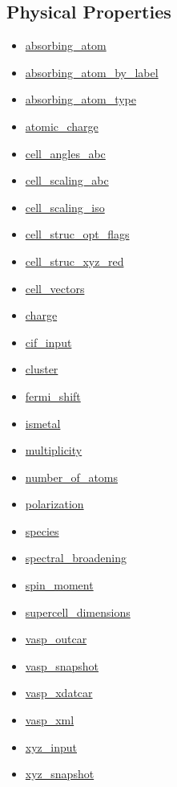 \documentclass[11pt]{article}
\begin{document}
\subsection*{Physical Properties}
\begin{itemize}
\item \hyperref[kw:absorbing-atom]{absorbing\_atom}
\item \hyperref[kw:absorbing-atom-by-label]{absorbing\_atom\_by\_label}
\item \hyperref[kw:absorbing-atom-type]{absorbing\_atom\_type}
\item \hyperref[kw:atomic-charge]{atomic\_charge}
\item \hyperref[kw:cell-angles-abc]{cell\_angles\_abc}
\item \hyperref[kw:cell-scaling-abc]{cell\_scaling\_abc}
\item \hyperref[kw:cell-scaling-iso]{cell\_scaling\_iso}
\item \hyperref[kw:cell-struc-opt-flags]{cell\_struc\_opt\_flags}
\item \hyperref[kw:cell-struc-xyz-red]{cell\_struc\_xyz\_red}
\item \hyperref[kw:cell-vectors]{cell\_vectors}
\item \hyperref[kw:charge]{charge}
\item \hyperref[kw:cif-input]{cif\_input}
\item \hyperref[kw:cluster]{cluster}
\item \hyperref[kw:fermi-shift]{fermi\_shift}
\item \hyperref[kw:ismetal]{ismetal}
\item \hyperref[kw:multiplicity]{multiplicity}
\item \hyperref[kw:number-of-atoms]{number\_of\_atoms}
\item \hyperref[kw:polarization]{polarization}
\item \hyperref[kw:species]{species}
\item \hyperref[kw:spectral-broadening]{spectral\_broadening}
\item \hyperref[kw:spin-moment]{spin\_moment}
\item \hyperref[kw:supercell-dimensions]{supercell\_dimensions}
\item \hyperref[kw:vasp-outcar]{vasp\_outcar}
\item \hyperref[kw:vasp-snapshot]{vasp\_snapshot}
\item \hyperref[kw:vasp-xdatcar]{vasp\_xdatcar}
\item \hyperref[kw:vasp-xml]{vasp\_xml}
\item \hyperref[kw:xyz-input]{xyz\_input}
\item \hyperref[kw:xyz-snapshot]{xyz\_snapshot}
\end{itemize}
\end{document}
